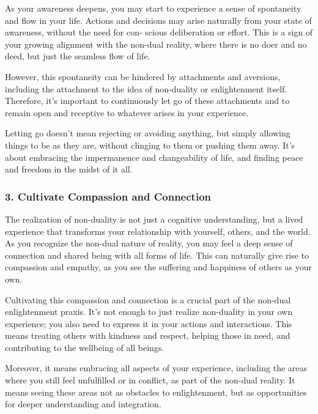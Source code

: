 \documentclass[12pt,openany]{book}
\begin{document}
As your awareness deepens, you may start to experience a sense of spontaneity and flow in your life. Actions and decisions may arise naturally from your state of awareness, without the need for con- \linebreak scious deliberation or effort. This is a sign of your growing alignment with the non-dual reality, where there is no doer and no deed, but just the seamless flow of life.

However, this spontaneity can be hindered by attachments and aversions, including the attachment to the idea of non-duality or enlightenment itself. Therefore, it's important to continuously let go of these attachments and to remain open and receptive to whatever arises in your experience.

Letting go doesn't mean rejecting or avoiding anything, but simply allowing things to be as they are, without clinging to them or pushing them away. It's about embracing the impermanence and \linebreak changeability of life, and finding peace and freedom in the midst of it all.

\subsubsection*{3. Cultivate Compassion and Connection}

The realization of non-duality is not just a cognitive understanding, but a lived experience that transforms your relationship with yourself, others, and the world. As you recognize the non-dual nature of reality, you may feel a deep sense of connection and shared being with all forms of life. This can naturally give rise to compassion and empathy, as you see the suffering and happiness of others as your own.

Cultivating this compassion and connection is a crucial part of the non-dual enlightenment praxis. It's not enough to just realize non-duality in your own experience; you also need to express it in your actions and interactions. This means treating others with kindness and respect, helping those in need, and contributing to the wellbeing of all beings.

Moreover, it means embracing all aspects of your experience, including the areas where you still feel unfulfilled or in conflict, as part of the non-dual reality. It means seeing these areas not as obstacles to enlightenment, but as opportunities for deeper understanding \linebreak and integration.
\end{document}
